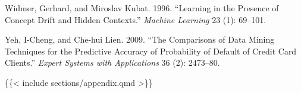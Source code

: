 \documentclass[conference,final,]{IEEEtran}
\newlength{\cslhangindent}
\newlength{\cslentryspacingunit} %
\newenvironment{CSLReferences}[2] %
 {%
  \setlength{\parindent}{0pt}
  \ifodd #1
  \let\oldpar\par
  \def\par{\hangindent=\cslhangindent\oldpar}
  \fi
  \setlength{\parskip}{#2\cslentryspacingunit}
 }%
 {}
\begin{document}
\begin{CSLReferences}{1}{0}
\leavevmode{}%
Widmer, Gerhard, and Miroslav Kubat. 1996. {``Learning in the Presence of Concept Drift and Hidden Contexts.''} \emph{Machine Learning} 23 (1): 69--101.

\leavevmode{}%
Yeh, I-Cheng, and Che-hui Lien. 2009. {``The Comparisons of Data Mining Techniques for the Predictive Accuracy of Probability of Default of Credit Card Clients.''} \emph{Expert Systems with Applications} 36 (2): 2473--80.

\end{CSLReferences}

\{\{\textless{} include sections/appendix.qmd \textgreater\}\}
\end{document}
